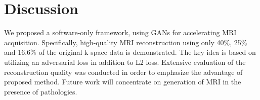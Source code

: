 \documentclass[review]{elsarticle}
\begin{document}
\begin{table}[H]
	\centering
	
	\caption{\textcolor{black}{\footnotesize{}{}Segmentation Dice score for different sampling ratios}{\footnotesize{}\label{tbl:DICE}}}
	
\end{table}

\section{Discussion}


We proposed a software-only framework, using GANs for accelerating MRI acquisition. Specifically, high-quality MRI reconstruction using only 40\%, 25\% and 16.6\% of the original k-space data is demonstrated. The key idea is based on utilizing an adversarial loss in addition to L2 loss. Extensive evaluation of the reconstruction quality was conducted in order to emphasize the advantage of proposed method.
Future work will concentrate on generation of MRI in the presence of pathologies.
\end{document}
